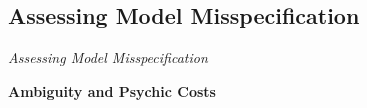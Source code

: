 \subsection{Assessing Model Misspecification}
\begin{frame}\begin{center}
\LARGE\textit{Assessing Model Misspecification}
\end{center}\end{frame}
\begin{frame}
\begin{center}\textbf{Ambiguity and Psychic Costs}
\begin{figure}[h!]\centering
{}\\\vspace{-0.3cm}
\hspace{1.0cm}

\end{figure}
\end{center}
\end{frame}
